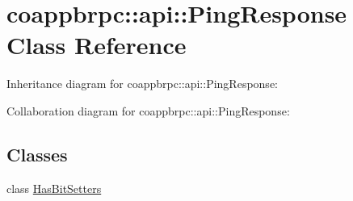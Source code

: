 \hypertarget{classcoappbrpc_1_1api_1_1PingResponse}{}\section{coappbrpc\+:\+:api\+:\+:Ping\+Response Class Reference}
\label{classcoappbrpc_1_1api_1_1PingResponse}


Inheritance diagram for coappbrpc\+:\+:api\+:\+:Ping\+Response\+:


Collaboration diagram for coappbrpc\+:\+:api\+:\+:Ping\+Response\+:
\subsection*{Classes}
\begin{DoxyCompactItemize}
\item 
class \hyperlink{classcoappbrpc_1_1api_1_1PingResponse_1_1HasBitSetters}{Has\+Bit\+Setters}
\end{DoxyCompactItemize}
